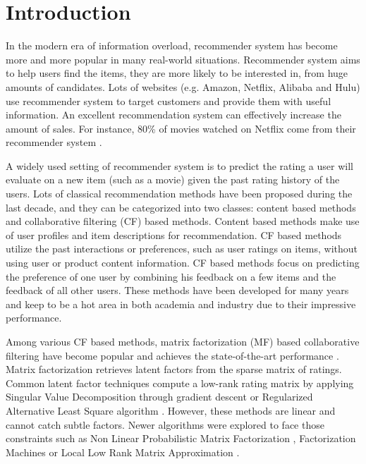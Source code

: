 \documentclass{sig-alternate-05-2015}
\begin{document}
\section{Introduction}
In the modern era of information overload,
recommender system has become more and more popular in many real-world situations.
Recommender system aims to help users find the items,
they are more likely to be interested in,
from huge amounts of candidates.
Lots of websites (e.g. Amazon, Netflix, Alibaba and Hulu) use recommender system to
target customers and provide them with useful information.
An excellent recommendation system can effectively increase the amount of sales.
For instance, 80\% of movies watched on Netflix
come from their recommender system \cite{gomez2015netflix}.

A widely used setting of recommender system is to
predict the rating a user will evaluate on a new item (such as a movie)
given the past rating history of the users.
Lots of classical recommendation methods have been proposed
during the last decade, and they can be categorized into two classes:
content based methods and collaborative filtering (CF) based methods.
Content based methods \cite{pazzani2007content} make use of
user profiles and item descriptions for recommendation.
CF based methods \cite{su2009survey} utilize
the past interactions or preferences, such as user ratings on items,
without using user or product content information.
CF based methods focus on predicting the preference of
one user by combining his feedback on a few items
and the feedback of all other users.
These methods have been developed for many years and
keep to be a hot area in both academia and industry
due to their impressive performance.

Among various CF based methods, matrix factorization (MF) based
collaborative filtering have become popular and
achieves the state-of-the-art performance \cite{koren2009matrix}.
Matrix factorization retrieves latent factors
from the sparse matrix of ratings.
Common latent factor techniques compute a low-rank rating matrix
by applying Singular Value Decomposition through gradient descent
\cite{koren2009matrix} or
Regularized Alternative Least Square algorithm \cite{zhou2008large}.
However, these methods are linear and cannot catch subtle factors.
Newer algorithms were explored to face those constraints such as
Non Linear Probabilistic Matrix Factorization \cite{pazzani2007content},
Factorization Machines \cite{rendle2010factorization} or
Local Low Rank Matrix Approximation \cite{lee2013local}.
\end{document}
